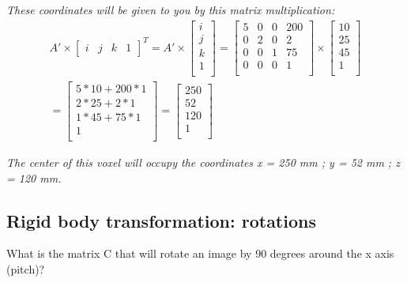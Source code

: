 \documentclass[a4paper,10pt]{article}
\begin{document}
\bigskip
\textit{These coordinates will be given to you by this matrix multiplication:}
\begin{align*}
A' \times \left[\begin{array}{cccc} i &j &k &1 \end{array}\right]^{T} = 
%
A' \times
\left[\begin{array}{c}
i\\
j\\
k\\
1\\
\end{array}\right]
%
=
\left[\begin{array}{cccc}
  5 	& 0 	& 0 	& 200\\ 
  0 	& 2 	& 0 	& 2\\
  0 	& 0 	& 1 	& 75\\
  0 	& 0 	& 0 	& 1\\
\end{array}\right]
\times
\left[\begin{array}{c}
10\\
25\\
45\\
1\\
\end{array}\right] \\
%
=
\left[\begin{array}{c}
5*10+200*1\\
2*25+2*1\\
1*45+75*1\\
1\\
\end{array}\right]
=
\left[\begin{array}{c}
250\\
52\\
120\\
1\\
\end{array}\right]
\end{align*}

\textit{The center of this  voxel will occupy the coordinates x = 250 mm ; y = 52 mm ; z = 120 mm.}


\subsection{Rigid body transformation: rotations}

What is the matrix C that will rotate an image by 90 degrees around the x axis (pitch)? 
\end{document}
